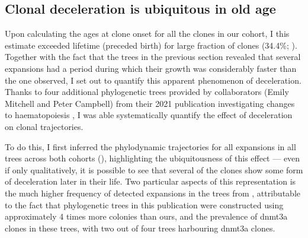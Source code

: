 \begin{figure}[!ht]
	\label{fig:trees-coefficients-ages-at-onset}
\end{figure}

\subsection{Clonal deceleration is ubiquitous in old age}

Upon calculating the ages at clone onset for all the clones in our cohort, I this estimate exceeded lifetime (preceded birth) for large fraction of clones (34.4\%; \figref{}). Together with the fact that the trees in the previous section revealed that several expansions had a period during which their growth was considerably faster than the one observed, I set out to quantify this apparent phenomenon of deceleration. Thanks to four additional phylogenetic trees provided by collaborators (Emily Mitchell and Peter Campbell) from their 2021 publication investigating changes to haematopoiesis \cite{Mitchell2021-zl}, I was able systematically quantify the effect of deceleration on clonal trajectories.

\begin{figure}[!ht]
	\label{fig:exceeds-within-lifetime-representation}
\end{figure}

To do this, I first inferred the phylodynamic trajectories for all expansions in all trees across both cohorts (), highlighting the ubiquitousness of this effect --- even if only qualitatively, it is possible to see that several of the clones show some form of deceleration later in their life. Two particular aspects of this representation is the much higher frequency of detected expansions in the trees from , attributable to the fact that phylogenetic trees in this publication were constructed using approximately 4 times more colonies than ours, and the prevalence of \ac{dnmt3a} clones in these trees, with two out of four trees harbouring \ac{dnmt3a} clones.

